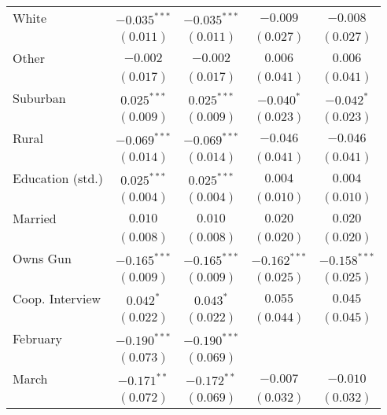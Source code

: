 \begin{table}
\begin{center}
\begin{tabular}{l c c c c}
White                   & $-0.035^{***}$ & $-0.035^{***}$ & $-0.009$       & $-0.008$       \\
                        & $(0.011)$      & $(0.011)$      & $(0.027)$      & $(0.027)$      \\
Other                   & $-0.002$       & $-0.002$       & $0.006$        & $0.006$        \\
                        & $(0.017)$      & $(0.017)$      & $(0.041)$      & $(0.041)$      \\
Suburban                & $0.025^{***}$  & $0.025^{***}$  & $-0.040^{*}$   & $-0.042^{*}$   \\
                        & $(0.009)$      & $(0.009)$      & $(0.023)$      & $(0.023)$      \\
Rural                   & $-0.069^{***}$ & $-0.069^{***}$ & $-0.046$       & $-0.046$       \\
                        & $(0.014)$      & $(0.014)$      & $(0.041)$      & $(0.041)$      \\
Education (std.)        & $0.025^{***}$  & $0.025^{***}$  & $0.004$        & $0.004$        \\
                        & $(0.004)$      & $(0.004)$      & $(0.010)$      & $(0.010)$      \\
Married                 & $0.010$        & $0.010$        & $0.020$        & $0.020$        \\
                        & $(0.008)$      & $(0.008)$      & $(0.020)$      & $(0.020)$      \\
Owns Gun                & $-0.165^{***}$ & $-0.165^{***}$ & $-0.162^{***}$ & $-0.158^{***}$ \\
                        & $(0.009)$      & $(0.009)$      & $(0.025)$      & $(0.025)$      \\
Coop. Interview         & $0.042^{*}$    & $0.043^{*}$    & $0.055$        & $0.045$        \\
                        & $(0.022)$      & $(0.022)$      & $(0.044)$      & $(0.045)$      \\
February                & $-0.190^{***}$ & $-0.190^{***}$ &                &                \\
                        & $(0.073)$      & $(0.069)$      &                &                \\
March                   & $-0.171^{**}$  & $-0.172^{**}$  & $-0.007$       & $-0.010$       \\
                        & $(0.072)$      & $(0.069)$      & $(0.032)$      & $(0.032)$      \\

\end{tabular}
\end{center}
\end{table}
